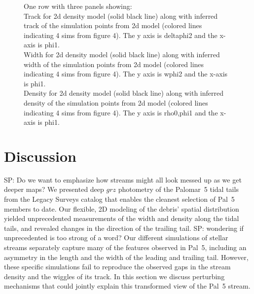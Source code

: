 \documentclass[twocolumn]{aastex62}
\newcommand{\ab}[1]{{\color{teal} AB: #1}}
\newcommand{\sa}[1]{{\color{magenta} SP: #1}}
\begin{document}
\begin{figure}
\caption{One row with three panels showing:\\
Track for 2d density model (solid black line) along with inferred track of the simulation points from 2d model (colored lines indicating 4 sims from figure 4). The y axis is deltaphi2 and the x-axis is phi1.\\
Width for 2d density model (solid black line) along with inferred width of the simulation points from 2d model (colored lines indicating 4 sims from figure 4). The y axis is wphi2 and the x-axis is phi1.\\
Density for 2d density model (solid black line) along with inferred density of the simulation points from 2d model (colored lines indicating 4 sims from figure 4). The y axis is rho0,phi1 and the x-axis is phi1.
}
\label{fig:model-sim-compare}
\end{figure}



\section{Discussion}
\label{sec:discussion}
\sa{Do we want to emphasize how streams might all look messed up as we get deeper maps?  }
We presented deep $grz$ photometry of the Palomar~5 tidal tails from the Legacy Surveys catalog that enables the cleanest selection of Pal~5 members to date.
Our flexible, 2D modeling of the debris' spatial distribution yielded unprecedented measurements of the width and density along the tidal tails, and revealed 
changes in the direction of the trailing tail. \sa{wondering if unprecedented is too strong of a word?}
Our different simulations
of stellar streams
separately capture many of the features observed in Pal~5, including an asymmetry in the length and the width of the leading and trailing tail.
However, these specific simulations fail to reproduce the observed gaps in the stream density and the wiggles of its track.
In this section we discuss perturbing mechanisms that could jointly explain this transformed view of the Pal~5 stream.
\end{document}
